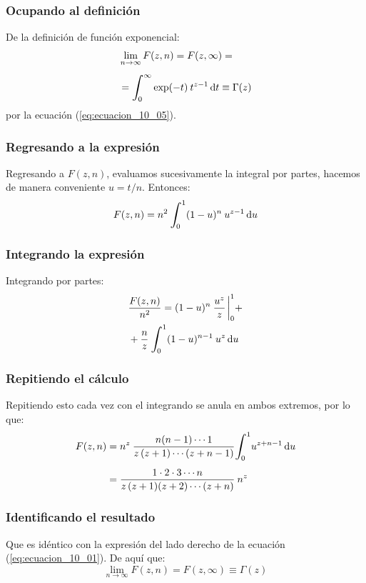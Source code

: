 \documentclass[12pt]{beamer}
\begin{document}
\begin{frame}
\frametitle{Ocupando al definición}
De la definición de función exponencial:
\pause
\begin{equation}
\begin{aligned}[b]
&\lim_{n \to \infty} F(z, n) = F (z, \infty) = \\[0.5em]
&= \scaleint{6ex}_{\bs 0}^{\infty} \exp(-t) \: t^{z - 1} \dd{t} \equiv \Gamma (z)
\end{aligned}
\label{eq:ecuacion_10_11}
\end{equation}
por la ecuación (\ref{eq:ecuacion_10_05}).
\end{frame}
\begin{frame}
\frametitle{Regresando a la expresión}
Regresando a $F (z, n)$, evaluamos sucesivamente la integral por partes, hacemos de manera conveniente $u = t/n$. Entonces:
\pause
\begin{align}
F (z, n) = n^{2} \: \scaleint{6ex}_{\bs 0}^{1} (1-u)^{n} \: u^{z-1} \dd{u}
\label{eq:ecuacion_10_12}
\end{align}
\end{frame}
\begin{frame}
\frametitle{Integrando la expresión}
Integrando por partes:
\pause
\begin{eqnarray}
\begin{aligned}[b]
&\dfrac{F (z, n)}{n^{2}} =  (1-u)^{n} \: \dfrac{u^{z}}{z} \eval_{0}^{1} + \\
&+ \dfrac{n}{z} \: \scaleint{6ex}_{\bs 0}^{1} (1-u)^{n-1} \: u^{z} \dd{u}
\end{aligned}
\label{eq:ecuacion_10_13}
\end{eqnarray}
\end{frame}
\begin{frame}
\frametitle{Repitiendo el cálculo}
Repitiendo esto cada vez con el integrando se anula en ambos extremos, por lo que:
\pause
\begin{align}
\begin{aligned}[b]
F (z, n) &= n^{z} \: \dfrac{n(n-1) \cdots 1}{z \, (z+1) \cdots (z+n-1)} \scaleint{6ex}_{\bs 0}^{1} u^{z+n-1} \dd{u} \\[0.5em]
&= \dfrac{1 \cdot 2 \cdot 3 \cdots n}{z \, (z+1)(z+2) \cdots (z+n)} \: n^{z}
\label{eq:ecuacion_10_14}
\end{aligned}
\end{align}
\end{frame}
\begin{frame}
\frametitle{Identificando el resultado}
Que es idéntico con la expresión del lado derecho de la ecuación (\ref{eq:ecuacion_10_01}). De aquí que:
\pause
\begin{equation}
\lim_{n \to \infty} F(z, n) = F(z, \infty) \equiv \Gamma (z)
\label{eq:ecuacion_10_15}
\end{equation}
\end{frame}
\end{document}
